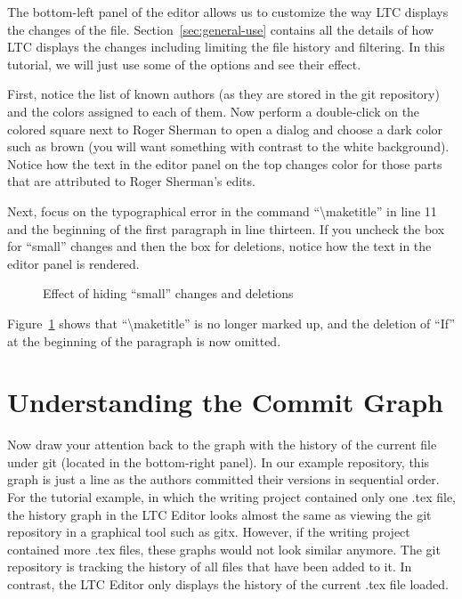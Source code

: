 The bottom-left panel of the editor allows us to customize the way LTC displays the changes of the file.  Section~\ref{sec:general-use} contains all the details of how LTC displays the changes including limiting the file history and filtering.  In this tutorial, we will just use some of the options and see their effect.

First, notice the list of known authors (as they are stored in the git repository) and the colors assigned to each of them.  Now perform a double-click on the colored square next to Roger Sherman to open a dialog and  choose a dark color such as brown (you will want something with contrast to the white background).  Notice how the text in the editor panel on the top changes color for those parts that are attributed to Roger Sherman's edits.

Next, focus on the typographical error in the command ``\textbackslash maketitle'' in line 11 and the beginning of the first paragraph in line thirteen.  If you uncheck the box for ``small'' changes and then the box for deletions, notice how the text in the editor panel is rendered.
\begin{figure}[t]
\centering
{}
\caption{Effect of hiding ``small'' changes and deletions} \label{fig:editor-filter-small}
\end{figure}
Figure~\ref{fig:editor-filter-small} shows that ``\textbackslash maketitle'' is no longer marked up, and the deletion of ``If'' at the beginning of the paragraph is now omitted.

\section{Understanding the Commit Graph}

Now draw your attention back to the graph with the history of the current file under git (located in the bottom-right panel).  In our example repository, this graph is just a line as the authors committed their versions in sequential order.  For the tutorial example, in which the writing project contained only one .tex file, the history graph in the LTC Editor looks almost the same as viewing the git repository in a graphical tool such as gitx.  However, if the writing project contained more .tex files, these graphs would not look similar anymore.  The git repository is tracking the history of all files that have been added to it.  In contrast, the LTC Editor only displays the history of the current .tex file loaded.

